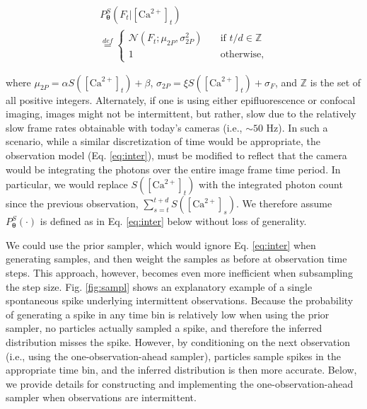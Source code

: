 \documentclass[10pt]{article}
\providecommand{\ve}[1]{\boldsymbol{#1}}
\providecommand{\ve}[1]{\boldsymbol{#1}}
\newcommand{\thetn}{\ve{\theta}}
\newcommand{\p}{P_{\thetn}}
\newcommand{\Ca}{[\text{Ca}^{2+}]}
\begin{document}
\begin{multline}\label{eq:inter}
\p^S(F_t|\Ca_t) \\ \overset{def}{=}
\begin{cases}
\mathcal{N}(F_t; \mu_{2P}, \sigma_{2P}^2) &\quad \text{if } t/d \in \mathbb{Z}\\
1 &\quad \text{otherwise,}
\end{cases}
\end{multline} 

\noindent where $\mu_{2P}= \alpha  S(\Ca_t) + \beta$, $\sigma_{2P}=\xi S(\Ca_t) + \sigma_F$, and  $\mathbb{Z}$ is the set of all positive integers.  Alternately, if one is using either epifluorescence or confocal imaging, images might not be intermittent, but rather, slow due to the relatively slow frame rates obtainable with today's cameras (i.e., $\sim 50$ Hz).  In such a scenario, while a similar discretization of time would be appropriate, the observation model (Eq. \ref{eq:inter}), must be modified to reflect that the camera would be integrating the photons over the entire image frame time period.  
%
%
In particular, we would replace $S(\Ca_t)$ with the integrated photon count since the previous observation, $\sum_{s=t}^{t+d} S(\Ca_s)$.  
We therefore assume $\p^S(\cdot)$ is defined as in Eq. \ref{eq:inter} below without loss of generality. %

We could use the prior sampler, which would ignore Eq. \ref{eq:inter} when generating samples, and then weight the samples as before at observation time steps.  This approach, however, becomes even more inefficient when subsampling the step size.  Fig. \ref{fig:sampl} shows an explanatory example of a single spontaneous spike underlying intermittent observations. Because the probability of generating a spike in any time bin is relatively low when using the prior sampler, no particles actually sampled a spike, and therefore the inferred distribution misses the spike. %
However, by conditioning on the next observation (i.e., using the one-observation-ahead sampler), particles sample spikes in the appropriate time bin, and the inferred distribution is then more accurate. Below, we provide details for constructing and implementing the one-observation-ahead sampler when observations are intermittent.
\end{document}
